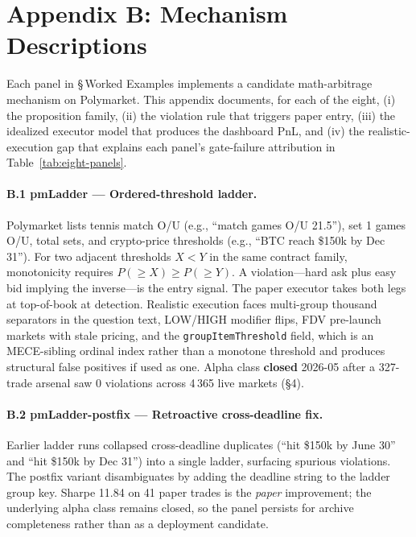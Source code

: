 \documentclass[11pt]{article}
\begin{document}
\section*{Appendix B: Mechanism Descriptions}

Each panel in \S\,Worked Examples implements a candidate math-arbitrage mechanism on Polymarket. This appendix documents, for each of the eight, (i) the proposition family, (ii) the violation rule that triggers paper entry, (iii) the idealized executor model that produces the dashboard PnL, and (iv) the realistic-execution gap that explains each panel's gate-failure attribution in Table~\ref{tab:eight-panels}.

\paragraph{B.1 pmLadder --- Ordered-threshold ladder.}
Polymarket lists tennis match O/U (e.g., ``match games O/U 21.5''), set 1 games O/U, total sets, and crypto-price thresholds (e.g., ``BTC reach \$150k by Dec 31''). For two adjacent thresholds $X < Y$ in the same contract family, monotonicity requires $P(\geq X) \geq P(\geq Y)$. A violation---hard ask plus easy bid implying the inverse---is the entry signal. The paper executor takes both legs at top-of-book at detection. Realistic execution faces multi-group thousand separators in the question text, LOW/HIGH modifier flips, FDV pre-launch markets with stale pricing, and the \texttt{groupItemThreshold} field, which is an MECE-sibling ordinal index rather than a monotone threshold and produces structural false positives if used as one. Alpha class \textbf{closed} 2026-05 after a 327-trade arsenal saw 0 violations across 4\,365 live markets (\S4).

\paragraph{B.2 pmLadder-postfix --- Retroactive cross-deadline fix.}
Earlier ladder runs collapsed cross-deadline duplicates (``hit \$150k by June 30'' and ``hit \$150k by Dec 31'') into a single ladder, surfacing spurious violations. The postfix variant disambiguates by adding the deadline string to the ladder group key. Sharpe 11.84 on 41 paper trades is the \emph{paper} improvement; the underlying alpha class remains closed, so the panel persists for archive completeness rather than as a deployment candidate.
\end{document}
